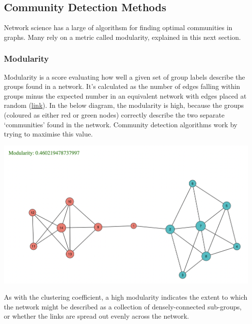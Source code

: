 \documentclass[
]{book}
\begin{document}
\hypertarget{community-detection-methods}{%
\subsection{Community Detection Methods}\label{community-detection-methods}}

Network science has a large of algorithsm for finding optimal communities in graphs. Many rely on a metric called modularity, explained in this next section.

\hypertarget{modularity}{%
\subsubsection{Modularity}\label{modularity}}

Modularity is a score evaluating how well a given set of group labels describe the groups found in a network. It's calculated as the number of edges falling within groups minus the expected number in an equivalent network with edges placed at random (\href{https://www.pnas.org/content/103/23/8577}{link}). In the below diagram, the modularity is high, because the groups (coloured as either red or green nodes) correctly describe the two separate `communities' found in the network. Community detection algorithms work by trying to maximise this value.

\includegraphics{images/modularity.png}

As with the clustering coefficient, a high modularity indicates the extent to which the network might be described as a collection of densely-connected sub-groups, or whether the links are spread out evenly across the network.
\end{document}
